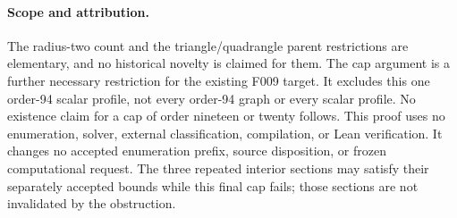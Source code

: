 \documentclass[11pt]{article}
\begin{document}
\paragraph{Scope and attribution.}
The radius-two count and the triangle/quadrangle parent restrictions
are elementary, and no historical novelty is claimed for them.
The cap argument is a further necessary restriction for the existing
F009 target. It excludes this one order-94 scalar profile, not every
order-94 graph or every scalar profile. No existence claim for a cap
of order nineteen or twenty follows. This proof uses no enumeration,
solver, external classification, compilation, or Lean verification.
It changes no accepted enumeration prefix, source disposition, or
frozen computational request. The three repeated interior sections
may satisfy their separately accepted bounds while this final cap
fails; those sections are not invalidated by the obstruction.
\end{document}
